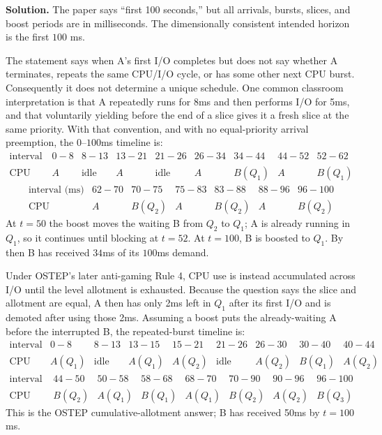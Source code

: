 \textbf{Solution.}
The paper says ``first 100 seconds,'' but all arrivals, bursts, slices, and
boost periods are in milliseconds.  The dimensionally consistent intended
horizon is the first \(100\) ms.

The statement says when A's first I/O completes but does not say whether A
terminates, repeats the same CPU/I/O cycle, or has some other next CPU burst.
Consequently it does not determine a unique schedule.  One common classroom
interpretation is that A repeatedly runs for 8ms and then performs I/O for
5ms, and that voluntarily yielding before the end of a slice gives it a fresh
slice at the same priority.  With that convention, and with no
equal-priority arrival preemption, the \(0\)--\(100\)ms timeline is:
\[
\begin{array}{c|rrrrrrrr}
\text{interval (ms)}
&0\!-\!8&8\!-\!13&13\!-\!21&21\!-\!26&26\!-\!34&34\!-\!44
&44\!-\!52&52\!-\!62\\ \hline
\text{CPU}
&A&\text{idle}&A&\text{idle}&A&B(Q_1)&A&B(Q_1)
\end{array}
\]
\[
\begin{array}{c|rrrrrr}
\text{interval (ms)}
&62\!-\!70&70\!-\!75&75\!-\!83&83\!-\!88&88\!-\!96&96\!-\!100\\ \hline
\text{CPU}
&A&B(Q_2)&A&B(Q_2)&A&B(Q_2)
\end{array}
\]
At \(t=50\) the boost moves the waiting B from \(Q_2\) to \(Q_1\); A is
already running in \(Q_1\), so it continues until blocking at \(t=52\).  At
\(t=100\), B is boosted to \(Q_1\).  By then B has received \(34\)ms of its
\(100\)ms demand.

Under OSTEP's later anti-gaming Rule 4, CPU use is instead accumulated across
I/O until the level allotment is exhausted. Because the question says the
slice and allotment are equal, A then has only 2ms left in \(Q_1\) after its
first I/O and is demoted after using those 2ms. Assuming a boost puts the
already-waiting A before the interrupted B, the repeated-burst timeline is:
\[
\begin{array}{c|rrrrrrrr}
\text{interval (ms)}
&0\!-\!8&8\!-\!13&13\!-\!15&15\!-\!21&21\!-\!26&26\!-\!30
&30\!-\!40&40\!-\!44\\ \hline
\text{CPU}
&A(Q_1)&\text{idle}&A(Q_1)&A(Q_2)&\text{idle}&A(Q_2)
&B(Q_1)&A(Q_2)
\end{array}
\]
\[
\begin{array}{c|rrrrrrr}
\text{interval (ms)}
&44\!-\!50&50\!-\!58&58\!-\!68&68\!-\!70&70\!-\!90&90\!-\!96
&96\!-\!100\\ \hline
\text{CPU}
&B(Q_2)&A(Q_1)&B(Q_1)&A(Q_1)&B(Q_2)&A(Q_2)&B(Q_3)
\end{array}
\]
This is the OSTEP cumulative-allotment answer; B has received 50ms by
\(t=100\)ms.

